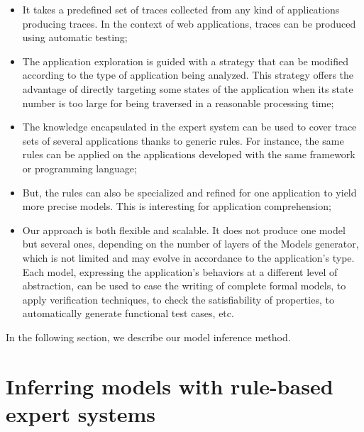\begin{itemize}
\item It takes a predefined set of traces collected from any kind
of applications producing traces. In the context of web
applications, traces can be produced using automatic testing;

\item The application exploration is guided with a strategy that
can be modified according to the type of application being
analyzed. This strategy offers the advantage of directly targeting
some states of the application when its state number is too large
for being traversed in a reasonable processing time;

\item The knowledge encapsulated in the expert system can be used
to cover trace sets of several applications thanks to generic
rules. For instance, the same rules can be applied on the
applications developed with the same framework or programming
language;

\item But, the rules can also be specialized and refined for one
application to yield more precise models. This is interesting for
application comprehension;

\item Our approach is both flexible and scalable. It does not
produce one model but several ones, depending on the number of
layers of the Models generator, which is not limited and may
evolve in accordance to the application's type. Each model,
expressing the application's behaviors at a different level of
abstraction, can be used to ease the writing of complete formal
models, to apply verification techniques, to check the
satisfiability of properties, to automatically generate
functional test cases, etc.
\end{itemize}

In the following section, we describe our model inference method.


\section{Inferring models with rule-based expert systems}
\label{sec:modelinf:webapps:contrib}

